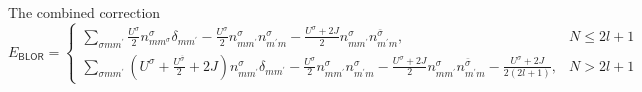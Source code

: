 \documentclass[xcolor=table,aspectratio=169]{beamer}
\numberwithin{equation}{section}
\begin{document}
\begin{frame}{The combined correction}
    \footnotesize
    \begin{equation*}
        E_{\mathsf{BLOR}}=\left\{\begin{array}{cc}
            \sum_{\sigma m m^{\prime}} \frac{U^\sigma}{2} n_{m m^\sigma}^\sigma \delta_{m m^{\prime}}-\frac{U^\sigma}{2} n_{m m^{\prime}}^\sigma n_{m^{\prime} m}^\sigma-\frac{U^\sigma+2 J}{2} n_{m m^{\prime}}^\sigma n_{m^{\prime} m}^{\bar{\sigma}},                                                                  & N \leqslant 2 l+1 \\
            \sum_{\sigma m m^{\prime}}\left(U^\sigma+\frac{U^{\bar{\sigma}}}{2}+2 J\right) n_{m m^{\prime}}^\sigma \delta_{m m^{\prime}}-\frac{U^\sigma}{2} n_{m m^{\prime}}^\sigma n_{m^{\prime} m}^\sigma-\frac{U^\sigma+2 J}{2} n_{m m^{\prime}}^\sigma n_{m^{\prime} m}^{\bar{\sigma}}-\frac{U^\sigma+2 J}{2(2 l+1)}, & N>2 l+1
        \end{array}\right.
    \end{equation*}
\end{frame}
\end{document}
